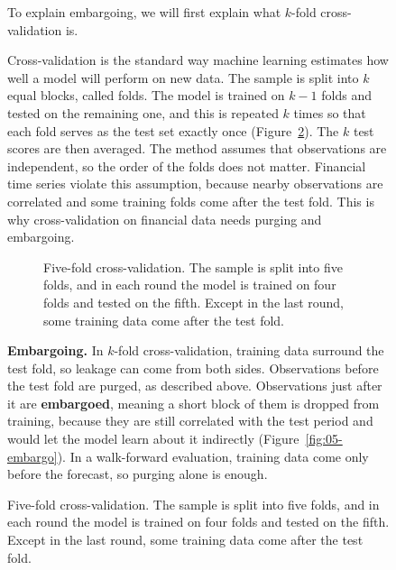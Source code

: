 \begin{figure}[htbp]
To explain embargoing, we will first explain what $k$-fold cross-validation is. 

Cross-validation is the standard way machine learning estimates how well a model will perform on new data. The sample is split into $k$ equal blocks, called folds. The model is trained on $k-1$ folds and tested on the remaining one, and this is repeated $k$ times so that each fold serves as the test set exactly once (Figure~\ref{fig:05-kfold}). The $k$ test scores are then averaged. The method assumes that observations are independent, so the order of the folds does not matter. Financial time series violate this assumption, because nearby observations are correlated and some training folds come after the test fold. This is why cross-validation on financial data needs purging and embargoing.

\begin{figure}[htbp]
  \centering
  \caption{Five-fold cross-validation. The sample is split into five folds, and
    in each round the model is trained on four folds and tested on the fifth.
    Except in the last round, some training data come after the test fold.}
  \label{fig:05-kfold}
\end{figure}

\textbf{Embargoing.} In $k$-fold cross-validation, training data surround the test fold, so leakage can come from both sides. Observations before the test fold are purged, as described above. Observations just after it are \textbf{embargoed}, meaning a short block of them is dropped from training, because they are still correlated with the test period and would let the model learn about it indirectly (Figure~\ref{fig:05-embargo}). In a walk-forward evaluation, training data come only before the forecast, so purging alone is enough.


\end{figure}
